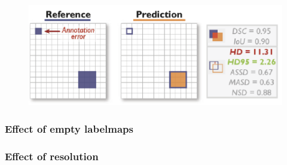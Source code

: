\documentclass[11pt]{article}
\begin{document}
\begin{figure}[H]
    \centering
    \includegraphics[width=.45\linewidth]{figures/noise-a.png}
    \caption{}
\end{figure}

\subsubsection{Effect of empty labelmaps}

\begin{figure}[H]
    \centering
\end{figure}

\subsubsection{Effect of resolution}
\end{document}
